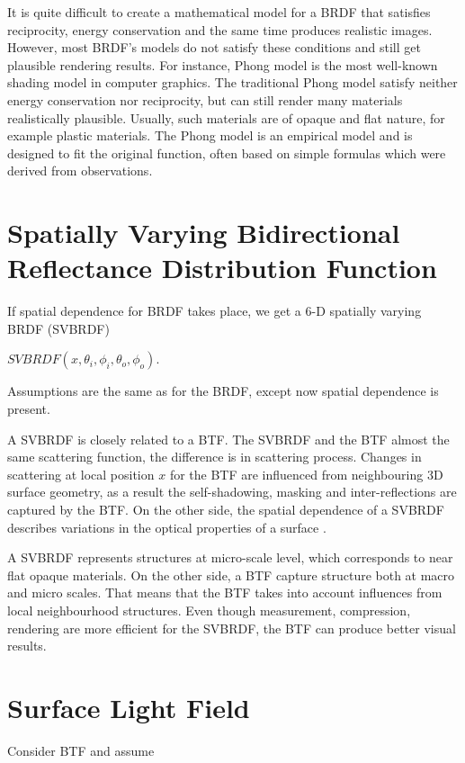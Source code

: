 It is quite difficult to create a mathematical model for a BRDF that satisfies reciprocity,
energy conservation and the same time produces realistic images. However, most BRDF's models do not satisfy these conditions and still get plausible rendering results.
For instance, Phong model is the most well-known shading model in computer graphics. 
The traditional Phong model satisfy neither energy conservation nor reciprocity, but can still render many materials realistically plausible.
Usually, such materials are of opaque and flat nature, for example plastic materials.
The Phong model is an empirical model and is designed to fit the original function, often based on simple formulas which were derived from observations.


\section{Spatially Varying Bidirectional Reflectance Distribution Function}
\label{section:svbrdf}
If spatial dependence for BRDF takes place, we get a 6-D spatially varying BRDF (SVBRDF)


 \begin{center}
$SVBRDF(x,\theta_{i} ,\phi_{i},\theta_{o} ,\phi_{o})$.
 \end{center}
 Assumptions are the same as for the BRDF, except now spatial dependence is present.
 
A SVBRDF is closely related to a BTF. The SVBRDF and the BTF almost the same scattering function, the difference is in scattering process. 
Changes in scattering at local position $x$ for the BTF are influenced from neighbouring 3D surface geometry, as a result the self-shadowing, masking and inter-reflections are captured by the BTF.
On the other side, the spatial dependence of a SVBRDF describes variations in the optical properties of a surface \cite{haindl_visual}.


 
A SVBRDF represents structures at micro-scale level, which corresponds to near flat opaque materials. On the other side, a BTF capture structure both at macro and micro scales.
 That means that the BTF takes into account influences from local neighbourhood structures. Even though measurement, compression, rendering are more efficient for the SVBRDF, 
 the BTF can produce better visual results. \cite{haindl_visual}
 
 
\section{Surface Light Field}
\label{section:slf}
Consider BTF and assume

